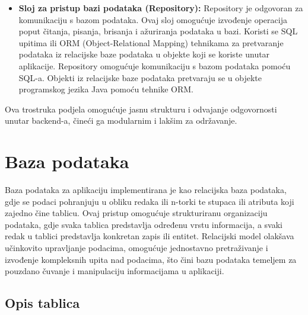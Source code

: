{\begin{itemize}
					\item \textbf{Sloj za pristup bazi podataka (Repository):}
					Repository je odgovoran za komunikaciju s bazom podataka. Ovaj sloj omogućuje izvođenje operacija poput čitanja, pisanja, brisanja i ažuriranja podataka u bazi. Koristi se SQL upitima ili ORM (Object-Relational Mapping) tehnikama za pretvaranje podataka iz relacijske baze podataka u objekte koji se koriste unutar aplikacije. Repository omogućuje komunikaciju s bazom podataka pomoću SQL-a. Objekti iz relacijske baze podataka pretvaraju se u objekte programskog jezika Java pomoću tehnike ORM.
					
				\end{itemize}
				
				Ova trostruka podjela omogućuje jasnu strukturu i odvajanje odgovornosti unutar backend-a, čineći ga modularnim i lakšim za održavanje.
				
				
			}
			
			
			
			
			
			
			
			
			\section{Baza podataka}
			
			
			
			{
				Baza podataka za aplikaciju implementirana je kao relacijska baza podataka, gdje se podaci pohranjuju u obliku redaka ili n-torki te stupaca ili atributa koji zajedno čine tablicu. Ovaj pristup omogućuje strukturiranu organizaciju podataka, gdje svaka tablica predstavlja određenu vrstu informacija, a svaki redak u tablici predstavlja konkretan zapis ili entitet. Relacijski model olakšava učinkovito upravljanje podacima, omogućuje jednostavno pretraživanje i izvođenje kompleksnih upita nad podacima, što čini bazu podataka temeljem za pouzdano čuvanje i manipulaciju informacijama u aplikaciji.}
			
			\subsection{Opis tablica}
			
